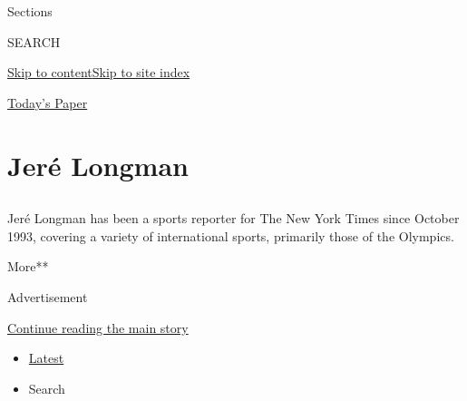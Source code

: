 Sections

SEARCH

\protect\hyperlink{site-content}{Skip to
content}\protect\hyperlink{site-index}{Skip to site index}

\href{https://myaccount.nytimes3xbfgragh.onion/auth/login?response_type=cookie\&client_id=vi}{}

\href{https://www.nytimes3xbfgragh.onion/section/todayspaper}{Today's
Paper}

\hypertarget{jeruxe9-longman}{%
\section{Jeré Longman}\label{jeruxe9-longman}}

\subsection{}

Jeré Longman has been a sports reporter for The New York Times since
October 1993, covering a variety of international sports, primarily
those of the Olympics.

More**

Advertisement

\protect\hyperlink{after-mid1}{Continue reading the main story}

\begin{itemize}
\tightlist
\item
  \protect\hyperlink{stream-panel}{Latest}
\item
  Search
\end{itemize}

